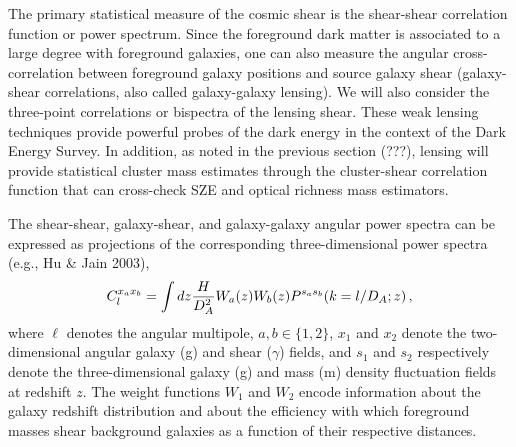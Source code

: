 \documentclass[preprint]{aastex}
\begin{document}
The primary statistical measure of the cosmic shear
is the shear-shear correlation function or power spectrum.
Since the foreground dark matter is associated to a
large degree with foreground galaxies, one can also measure the
angular cross-correlation between foreground galaxy positions and source
galaxy shear (galaxy-shear correlations, also called galaxy-galaxy
lensing). We will also consider the three-point correlations or
bispectra of the lensing shear.
These weak lensing techniques provide powerful probes of
the dark energy in the context of the Dark Energy Survey. In
addition, as noted in the previous section (???), lensing will provide
statistical cluster mass estimates through the cluster-shear
correlation function that can cross-check SZE and optical richness
mass estimators.

The shear-shear, galaxy-shear, and galaxy-galaxy angular
power spectra can be expressed as projections of the corresponding
three-dimensional power spectra (e.g., Hu \& Jain 2003),
\begin{equation}
C_l^{x_a x_b} = \int dz {H \over D_A^2} W_a(z) W_b(z) P^{s_a s_b}(k=l/D_A;z)\,,
\label{eqn:Limber}
\end{equation}
where $\ell$ denotes the angular multipole, $a, b\in\{1, 2\}$, $x_1$
and $x_2$ denote the two-dimensional angular galaxy (g) and shear
($\gamma$) fields, and $s_1$ and $s_2$ respectively denote the
three-dimensional galaxy (g) and mass (m) density fluctuation fields
at redshift $z$. The weight functions $W_1$ and $W_2$ encode
information about the galaxy redshift distribution and about the
efficiency with which foreground masses shear background galaxies as
a function of their respective distances.
\end{document}
